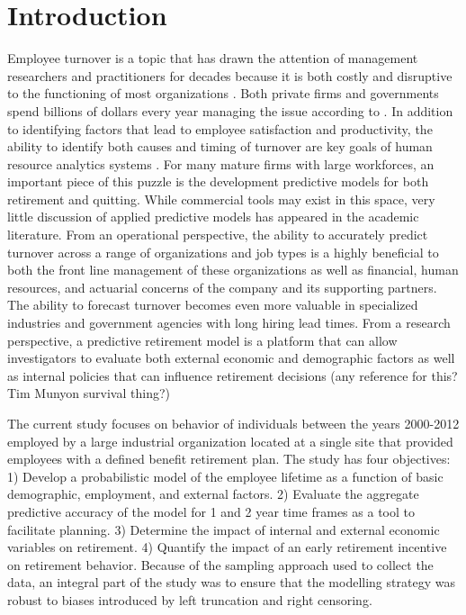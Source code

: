 \documentclass[12pt,letterpaper]{article}
\begin{document}
\section{Introduction}
Employee turnover is a topic that has drawn the attention of management researchers and practitioners for decades because it is both costly and disruptive to the functioning of most organizations \citep{staw1980, mueller1989, kacmar2006}.  Both private firms and governments spend billions of dollars every year managing the issue according to \citet{leonard2001}. In addition to identifying factors that lead to employee satisfaction and  productivity, the ability to identify both causes and timing of turnover are key goals of human resource analytics systems \citep{IBM}. For many mature firms with large workforces, an important piece of this puzzle is the development predictive models for both retirement and quitting.  While commercial tools may exist in this space, very little discussion of applied predictive models has appeared in the academic literature.  From an operational perspective, the ability to accurately predict turnover across a range of organizations and job types is a highly beneficial to both the front line management of these organizations as well as financial, human resources, and actuarial concerns of the company and its supporting partners. The ability to forecast turnover becomes even more valuable in specialized industries and government agencies with long hiring lead times. From a research perspective, a predictive retirement model is a platform that can allow investigators to evaluate both external economic and demographic factors as well as internal policies that can influence retirement decisions (any reference for this? Tim Munyon survival thing?)

The current study focuses on behavior of individuals between the years 2000-2012 employed by a large industrial organization located at a single site that provided employees with a defined benefit retirement plan.  The study has four objectives: 1) Develop a probabilistic model of the employee lifetime as a function of basic demographic, employment, and external factors.  2) Evaluate the aggregate predictive accuracy of the model for 1 and 2 year time frames as a tool to facilitate planning. 3) Determine the impact of internal and external economic variables on retirement. 4) Quantify the impact of an early retirement incentive on retirement behavior.  Because of the sampling approach used to collect the data, an integral part of the study was to ensure that the modelling strategy was robust to biases introduced by left truncation and right censoring.
\end{document}
